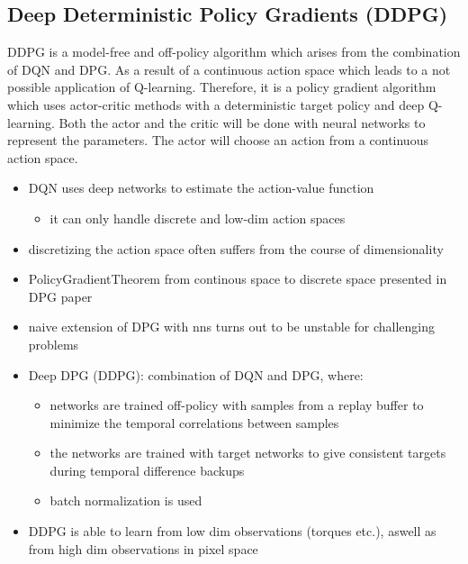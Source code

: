 \subsection{Deep Deterministic Policy Gradients (DDPG)
\cite{lillicrap2015continuous}}
DDPG is a model-free and off-policy algorithm which arises from the combination 
of DQN and DPG. As a result of a continuous action space which leads to a not 
possible application of Q-learning. Therefore, it is a policy gradient 
algorithm which uses actor-critic methods with a deterministic target policy 
and deep Q-learning. Both the actor and the critic will be done with neural 
networks to represent the parameters. The actor will choose an action from a 
continuous action space. 
\begin{itemize}
\item DQN uses deep networks to estimate the action-value function
\begin{itemize}
\item it can only handle discrete and low-dim action spaces
\end{itemize}
\item discretizing the action space often suffers from the course of dimensionality
\item PolicyGradientTheorem from continous space to discrete space presented in DPG paper
\item naive extension of DPG with nns turns out to be unstable for challenging problems
\item Deep DPG (DDPG): combination of DQN and DPG, where:
\begin{itemize}
\item networks are trained off-policy with samples from a replay buffer to minimize the temporal correlations between samples
\item the networks are trained with target networks to give consistent targets during temporal difference backups
\item batch normalization is used
\end{itemize}
\item DDPG is able to learn from low dim observations (torques etc.), aswell as from high dim observations in pixel space
\end{itemize}


